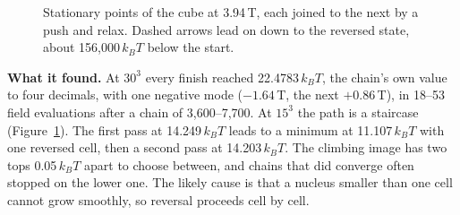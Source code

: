 \documentclass[10pt,a4paper]{article}
\begin{document}
\begin{figure}[h]
\centering
{}
\caption{Stationary points of the cube at 3.94\,T, each joined to the next by a push and relax. Dashed arrows lead on down to the
reversed state, about 156,000\,$k_BT$ below the start.}
\label{fig:stairs}
\end{figure}

\textbf{What it found.} At $30^3$ every finish reached 22.4783\,$k_BT$, the chain's own value to four decimals, with one
negative mode ($-1.64$\,T, the next $+0.86$\,T), in 18--53 field evaluations after a chain of 3,600--7,700. At $15^3$ the path is a
staircase (Figure~\ref{fig:stairs}). The first pass at 14.249\,$k_BT$ leads to a minimum at 11.107\,$k_BT$ with one reversed cell,
then a second pass at 14.203\,$k_BT$. The climbing image has two tops 0.05\,$k_BT$ apart to choose between, and chains that did
converge often stopped on the lower one. The likely cause is that a nucleus smaller than one cell cannot grow smoothly, so
reversal proceeds cell by cell.
\end{document}
